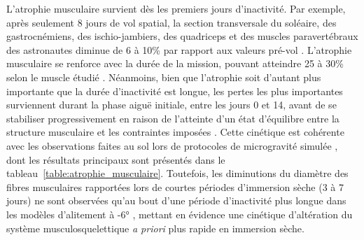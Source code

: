 \documentclass[11pt]{report}
\begin{document}
L'atrophie musculaire survient dès les premiers jours d'inactivité. Par exemple, après seulement 8 jours de vol spatial, la section transversale du soléaire, des gastrocnémiens, des ischio-jambiers, des quadriceps et des muscles paravertébraux des astronautes diminue de 6 à 10\% par rapport aux valeurs pré-vol \parencite{LeBlanc1995Dec}. L'atrophie musculaire se renforce avec la durée de la mission, pouvant atteindre 25 à 30\% selon le muscle étudié \parencite{adams_skeletal_2003, williams_acclimation_2009}. Néanmoins, bien que l'atrophie soit d'autant plus importante que la durée d'inactivité est longue, les pertes les plus importantes surviennent durant la phase aiguë initiale, entre les jours 0 et 14, avant de se stabiliser progressivement en raison de l'atteinte d'un état d'équilibre entre la structure musculaire et les contraintes imposées \parencite{williams_acclimation_2009}. Cette cinétique est cohérente avec les observations faites au sol lors de protocoles de microgravité simulée \parencite{adams_skeletal_2003}, dont les résultats principaux sont présentés dans le tableau~\ref{table:atrophie_musculaire}. Toutefois, les diminutions du diamètre des fibres musculaires rapportées lors de courtes périodes d'immersion sèche (3 à 7 jours) ne sont observées qu'au bout d'une période d'inactivité plus longue dans les modèles d'alitement à -6° \parencite{tomilovskaya_dry_2019, shenkman_cellular_2019,Bamman1998Jan,demangel_early_2017}, mettant en évidence une cinétique d'altération du système musculosquelettique \textit{a priori} plus rapide en immersion sèche. 
\end{document}

